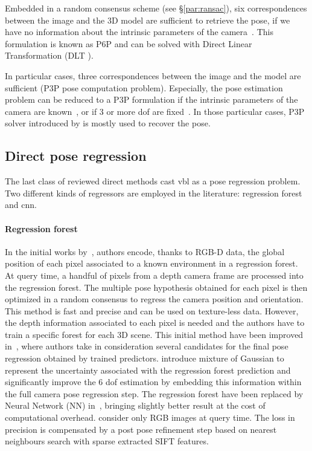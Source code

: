 			Embedded in a random consensus scheme (see \S\ref{par:ransac}), six correspondences between the image and the 3D model are sufficient to retrieve the pose, if we have no information about the intrinsic parameters of the camera~\citep{Donoser2014,Li2010,Li2010,Heisterklaus2014}. This formulation is known as P6P and can be solved with Direct Linear Transformation (DLT \citep{Hartley2003}).
			
			In particular cases, three correspondences between the image and the model are sufficient (P3P pose computation problem). Especially, the pose estimation problem can be reduced to a P3P formulation if the intrinsic parameters of the camera are known~\citep{Irschara2009,Middelberg2014}, or if 3 or more \ac{dof} are fixed~\citep{Zeisl2015,Qu2016}. In those particular cases, P3P solver introduced by \citet{Kneip2011} is mostly used to recover the pose. 
												
	\subsection{Direct pose regression}
    	\label{subsec:pose_regression}
    	The last class of reviewed direct methods cast \ac{vbl} as a pose regression problem. Two different kinds of regressors are employed in the literature: regression forest and \ac{cnn}.
    	
		\paragraph{Regression forest}
			In the initial works by~\citet{Shotton2013}, authors encode, thanks to RGB-D data, the global position of each pixel associated to a known environment in a regression forest. At query time, a handful of pixels from a depth camera frame are processed into the regression forest. The multiple pose hypothesis obtained for each pixel is then optimized in a random consensus to regress the camera position and orientation. This method is fast and precise and can be used on texture-less data. However, the depth information associated to each pixel is needed and the authors have to train a specific forest for each 3D scene. This initial method have been improved in~\citep{Guzman-rivera2014}, where authors take in consideration several candidates for the final pose regression obtained by trained predictors. \citet{Valentin2015} introduce mixture of Gaussian to represent the uncertainty associated with the regression forest prediction and significantly improve the 6 \ac{dof} estimation by embedding this information within the full camera pose regression step. The regression forest have been replaced by Neural Network (NN) in~\citep{Massiceti2016}, bringing slightly better result at the cost of computational overhead. \citet{Meng2016} consider only RGB images at query time. The loss in precision is compensated by a post pose refinement step based on nearest neighbours search with sparse extracted SIFT features.
            
